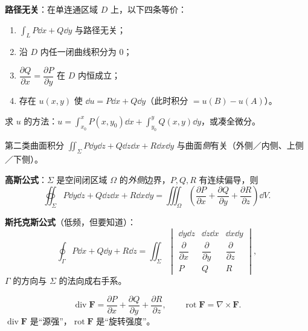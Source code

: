 \textbf{路径无关}：在单连通区域 $D$ 上，以下四条等价：
\begin{enumerate}[leftmargin=1.8em,itemsep=1pt]
\item $\displaystyle\int_L P\dd x+Q\dd y$ 与路径无关；
\item 沿 $D$ 内任一闭曲线积分为 0；
\item $\dfrac{\partial Q}{\partial x}=\dfrac{\partial P}{\partial y}$ 在 $D$ 内恒成立；
\item 存在 $u(x,y)$ 使 $\dd u=P\dd x+Q\dd y$（此时积分 $=u(B)-u(A)$）。
\end{enumerate}
求 $u$ 的方法：$u=\displaystyle\int_{x_0}^{x}P(x,y_0)\dd x+\int_{y_0}^{y}Q(x,y)\dd y$，或凑全微分。


第二类曲面积分 $\displaystyle\iint_\Sigma P\dd y\dd z+Q\dd z\dd x+R\dd x\dd y$ 与曲面\emph{侧}有关（外侧／内侧、上侧／下侧）。

\textbf{高斯公式}：$\Sigma$ 是空间闭区域 $\Omega$ 的\emph{外侧}边界，$P,Q,R$ 有连续偏导，则
\[
\oiint_\Sigma P\dd y\dd z+Q\dd z\dd x+R\dd x\dd y=\iiint_\Omega\left(\frac{\partial P}{\partial x}+\frac{\partial Q}{\partial y}+\frac{\partial R}{\partial z}\right)\dd V .
\]


\textbf{斯托克斯公式}（低频，但要知道）：
\[
\oint_\Gamma P\dd x+Q\dd y+R\dd z=\iint_\Sigma
\begin{vmatrix}
\dd y\dd z & \dd z\dd x & \dd x\dd y\\[2pt]
\dfrac{\partial}{\partial x} & \dfrac{\partial}{\partial y} & \dfrac{\partial}{\partial z}\\[4pt]
P & Q & R
\end{vmatrix},
\]
$\Gamma$ 的方向与 $\Sigma$ 的法向成右手系。


\[
\operatorname{div}\boldsymbol F=\frac{\partial P}{\partial x}+\frac{\partial Q}{\partial y}+\frac{\partial R}{\partial z},\qquad
\operatorname{rot}\boldsymbol F=\nabla\times\boldsymbol F .
\]
$\operatorname{div}\boldsymbol F$ 是“源强”，$\operatorname{rot}\boldsymbol F$ 是“旋转强度”。

